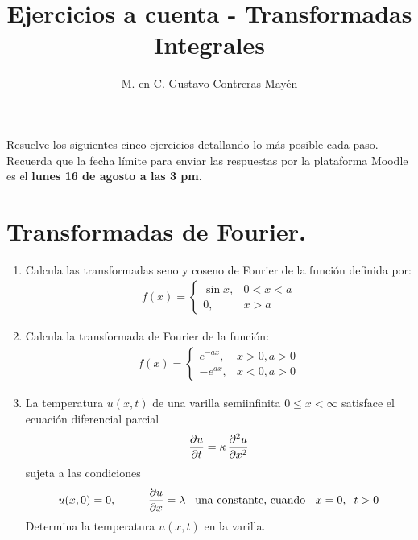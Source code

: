 
\title{Ejercicios a cuenta - Transformadas Integrales
} \vspace{-3ex}
\author{M. en C. Gustavo Contreras Mayén}
\date{ }
\newcommand{\Cancel}[2][black]{{\color{#1}\cancel{\color{black}#2}}}


\vspace{-4cm}
\maketitle
\fontsize{14}{14}\selectfont


Resuelve los siguientes cinco ejercicios detallando lo más posible cada paso. Recuerda que la fecha límite para enviar las respuestas por la plataforma Moodle es el \textbf{lunes 16 de agosto a las 3 pm}.

\section{Transformadas de Fourier.}
\begin{enumerate}
\item Calcula las transformadas seno y coseno de Fourier de la función definida por:
\begin{align*}
f(x) = \begin{cases}
\sin x, & 0 < x < a \\
0, & x > a
\end{cases}
\end{align*}
\item Calcula la transformada de Fourier de la función:
\begin{align*}
f(x) = \begin{cases}
e^{-a x}, & x > 0, a > 0 \\
-e^{a x}, & x < 0, a > 0
\end{cases}
\end{align*}
\item La temperatura $u (x, t)$ de una varilla semiinfinita
$0 \leq x < \infty$ satisface el ecuación diferencial parcial
\begin{align*}
\pdv{u}{t} = \kappa \, \pdv[2]{u}{x}
\end{align*}
sujeta a las condiciones
\begin{align*}
u(x, 0) = 0, \hspace{1cm} \pdv{u}{x} = \lambda \hspace{0.3cm} \mbox{una constante, cuando } \hspace{0.2cm} x = 0, \hspace{0.2cm} t > 0
\end{align*}
Determina la temperatura $u(x, t)$ en la varilla.
\end{enumerate}

